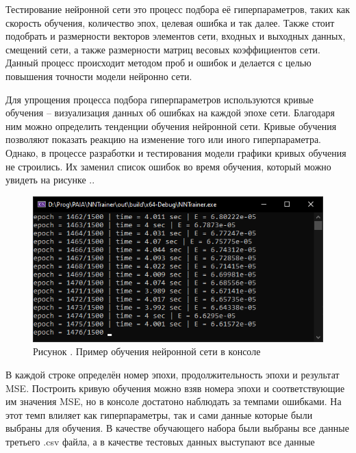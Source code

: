 {\gostFont

  \par \redline Тестирование нейронной сети это процесс подбора её гиперпараметров, таких как скорость обучения, количество эпох, целевая ошибка и так далее. Также стоит подобрать и размерности векторов элементов сети, входных и выходных данных, смещений сети, а также размерности матриц весовых коэффициентов сети. Данный процесс происходит методом проб и ошибок и делается с целью повышения точности модели нейронно сети. 

  \par \redline Для упрощения процесса подбора гиперпараметров используются кривые обучения {--} визуализация данных об ошибках на каждой эпохе сети. Благодаря ним можно определить тенденции обучения нейронной сети. Кривые обучения позволяют показать реакцию на изменение того или иного гиперпараметра. Однако, в процессе разработки и тестирования модели графики кривых обучения не строились. Их заменил список ошибок во время обучения, который можно увидеть на рисунке \thechaptercntr .\theimagecntr.

  \begin{figure}[H]
    \centering
    \def\svgwidth{\textwidth}
    \includegraphics[width=120mm]{images/CurvedLerning.png}
    \caption*{\gostFont Рисунок \thechaptercntr .\theimagecntr \spc {--} Пример обучения нейронной сети в консоле}
    \label{fig:NNWhiteBox}
  \end{figure} \addtocounter{imagecntr}{1}

  \par \redline В каждой строке определён номер эпохи, продолжительность эпохи и результат MSE. Построить кривую обучения можно взяв номера эпохи и соответствующие им значения MSE, но в консоле достатоно наблюдать за темпами ошибками. На этот темп влиляет как гиперпараметры, так и сами данные которые были выбраны для обучения. В качестве обучающего набора были выбраны все данные третьего .csv файла, а в качестве тестовых данных выступают все данные   

}
